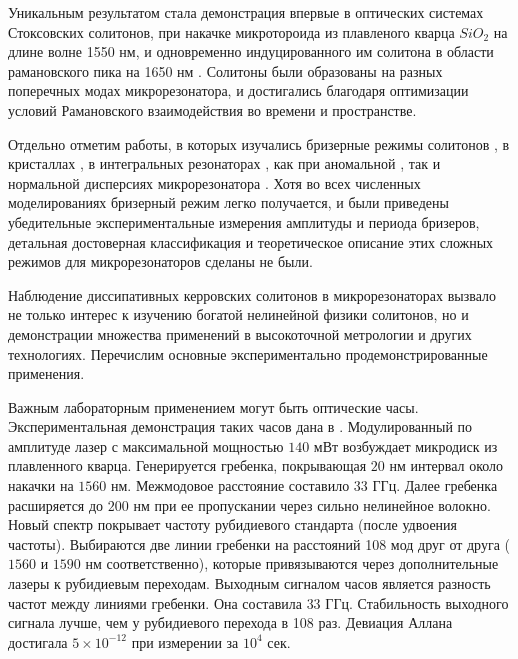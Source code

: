 Уникальным результатом стала демонстрация впервые в оптических системах Стоксовских солитонов, при накачке микротороида из плавленого кварца $SiO_2$ на длине волне 1550 нм, и одновременно индуцированного им солитона в области рамановского пика на 1650 нм \cite{Yang2016stokes}. Солитоны были образованы на разных поперечных модах микрорезонатора, и достигались благодаря оптимизации условий Рамановского взаимодействия во времени и пространстве.

Отдельно отметим работы, в которых изучались бризерные режимы солитонов \cite{Matsko2012}, в кристаллах \cite{Lucas2017breather}, в интегральных резонаторах \cite{PhysRevLett.117.163901,Yu2017breather}, как при аномальной \cite{Yu2017breather}, так и нормальной дисперсиях микрорезонатора \cite{PhysRevLett.121.257401}. Хотя во всех численных моделированиях бризерный режим легко получается, и были приведены убедительные экспериментальные измерения амплитуды и периода бризеров, детальная достоверная классификация и теоретическое описание этих сложных режимов для микрорезонаторов сделаны не были.

Наблюдение диссипативных керровских солитонов в микрорезонаторах вызвало не только интерес к изучению богатой нелинейной физики солитонов, но и демонстрации множества применений в высокоточной метрологии и других технологиях. Перечислим основные экспериментально продемонстрированные применения.

Важным лабораторным применением могут быть оптические часы. Экспериментальная демонстрация таких часов дана в \cite{Papp2014}. Модулированный по амплитуде лазер с максимальной мощностью $140$ мВт возбуждает микродиск из плавленного кварца. Генерируется гребенка, покрывающая $20$ нм интервал около накачки на $1560$ нм. Межмодовое расстояние составило $33$ ГГц. Далее гребенка расширяется до $200$ нм при ее пропускании через сильно нелинейное волокно. Новый спектр покрывает частоту рубидиевого стандарта (после удвоения частоты). Выбираются две линии гребенки на расстояний 108 мод друг от друга ($1560$ и $1590$ нм соответственно), которые привязываются через дополнительные лазеры к рубидиевым переходам. Выходным сигналом часов является разность частот между линиями гребенки. Она составила $33$ ГГц. Стабильность выходного сигнала лучше, чем у рубидиевого перехода в 108 раз. Девиация Аллана достигала $5\times10^{-12}$ при измерении за $10^4$ сек.


